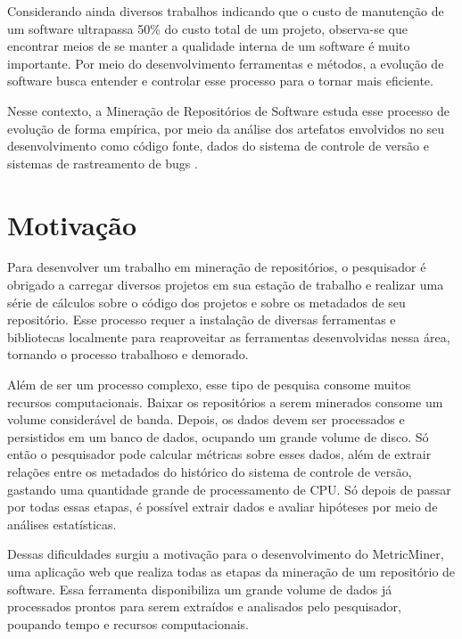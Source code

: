 \documentclass[a4paper, 12pt, twoside]{book}
\begin{document}
        Considerando ainda diversos trabalhos indicando que o custo de manutenção de um software 
        ultrapassa 50\% do custo total de um projeto, observa-se que encontrar meios de se
        manter a qualidade interna de um software é muito importante. Por meio do desenvolvimento 
        ferramentas e métodos, a evolução de software busca entender e controlar esse processo
        para o tornar mais eficiente.
        
        Nesse contexto, a Mineração de Repositórios de Software estuda esse processo de evolução de forma empírica, 
        por meio da análise dos artefatos envolvidos no seu desenvolvimento como código fonte, dados do sistema de
        controle de versão e sistemas de rastreamento de bugs \cite{Kagdi:2007}. 

    \section{Motivação}
        Para desenvolver um trabalho em mineração de repositórios, o pesquisador é obrigado a carregar 
        diversos projetos em sua estação de trabalho e realizar uma série de cálculos sobre o código 
        dos projetos e sobre os metadados de seu repositório. Esse processo requer a instalação de diversas
        ferramentas e bibliotecas localmente para reaproveitar as ferramentas desenvolvidas nessa área,
        tornando o processo trabalhoso e demorado.

        Além de ser um processo complexo, esse tipo de pesquisa consome muitos recursos computacionais.
        Baixar os repositórios a serem minerados consome um volume considerável de banda. Depois, os 
        dados devem ser processados e persistidos em um banco de dados, ocupando um grande volume de 
        disco. Só então o pesquisador pode calcular métricas sobre esses dados, além de extrair relações
        entre os metadados do histórico do sistema de controle de versão, gastando uma quantidade grande 
        de processamento de CPU. Só depois de passar por todas essas etapas, é possível extrair dados e 
        avaliar hipóteses por meio de análises estatísticas.

        Dessas dificuldades surgiu a motivação para o desenvolvimento do MetricMiner, uma aplicação web
        que realiza todas as etapas da mineração de um repositório de software. Essa ferramenta disponibiliza
        um grande volume de dados já processados prontos para serem extraídos e analisados pelo pesquisador, 
        poupando tempo e recursos computacionais.
    
\end{document}
